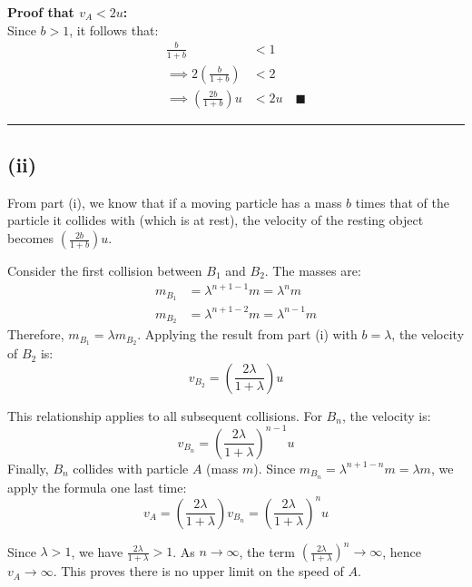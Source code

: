 ﻿\documentclass[12pt]{article}
\begin{document}
\textbf{Proof that $v_A < 2u$:} \\
Since $b > 1$, it follows that:
\begin{align*}
    \frac{b}{1+b} &< 1 \\
    \implies 2\left(\frac{b}{1+b}\right) &< 2 \\
    \implies \left(\frac{2b}{1+b}\right)u &< 2u \quad \blacksquare
\end{align*}

\bigskip\hrule\bigskip
\subsection*{(ii)}
From part (i), we know that if a moving particle has a mass $b$ times that of the particle it collides with (which is at rest), the velocity of the resting object becomes $\left(\frac{2b}{1+b}\right)u$.

Consider the first collision between $B_1$ and $B_2$. The masses are:
\begin{align*}
    m_{B_1} &= \lambda^{n+1-1}m = \lambda^n m \\
    m_{B_2} &= \lambda^{n+1-2}m = \lambda^{n-1} m
\end{align*}
Therefore, $m_{B_1} = \lambda m_{B_2}$.
Applying the result from part (i) with $b = \lambda$, the velocity of $B_2$ is:
\begin{equation*}
    v_{B_2} = \left(\frac{2\lambda}{1+\lambda}\right)u
\end{equation*}

This relationship applies to all subsequent collisions. For $B_n$, the velocity is:
\begin{equation*}
    v_{B_n} = \left(\frac{2\lambda}{1+\lambda}\right)^{n-1}u
\end{equation*}
Finally, $B_n$ collides with particle $A$ (mass $m$). Since $m_{B_n} = \lambda^{n+1-n}m = \lambda m$, we apply the formula one last time:
\begin{equation*}
    v_A = \left(\frac{2\lambda}{1+\lambda}\right)v_{B_n} = \left(\frac{2\lambda}{1+\lambda}\right)^n u
\end{equation*}

Since $\lambda > 1$, we have $\frac{2\lambda}{1+\lambda} > 1$.
As $n \to \infty$, the term $\left(\frac{2\lambda}{1+\lambda}\right)^n \to \infty$, hence $v_A \to \infty$. This proves there is no upper limit on the speed of $A$.
\end{document}

